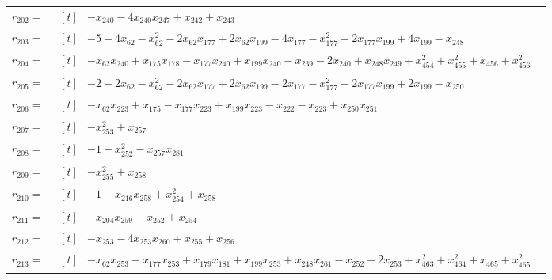 \begin{longtable}{@{}r p{0.92\linewidth}@{}}
$r_{202}=$ & $\begin{aligned}[t]&-x_{240}-4x_{240}x_{247}+x_{242}+x_{243}\end{aligned}$ \\[2pt]
$r_{203}=$ & $\begin{aligned}[t]&-5-4x_{62}-x_{62}^{2}-2x_{62}x_{177}+2x_{62}x_{199}-4x_{177}-x_{177}^{2}+2x_{177}x_{199}+4x_{199}-x_{248}\end{aligned}$ \\[2pt]
$r_{204}=$ & $\begin{aligned}[t]&-x_{62}x_{240}+x_{175}x_{178}-x_{177}x_{240}+x_{199}x_{240}-x_{239}-2x_{240}+x_{248}x_{249}+x_{454}^{2}+x_{455}^{2}+x_{456}+x_{456}^{2}\end{aligned}$ \\[2pt]
$r_{205}=$ & $\begin{aligned}[t]&-2-2x_{62}-x_{62}^{2}-2x_{62}x_{177}+2x_{62}x_{199}-2x_{177}-x_{177}^{2}+2x_{177}x_{199}+2x_{199}-x_{250}\end{aligned}$ \\[2pt]
$r_{206}=$ & $\begin{aligned}[t]&-x_{62}x_{223}+x_{175}-x_{177}x_{223}+x_{199}x_{223}-x_{222}-x_{223}+x_{250}x_{251}\end{aligned}$ \\[2pt]
$r_{207}=$ & $\begin{aligned}[t]&-x_{253}^{2}+x_{257}\end{aligned}$ \\[2pt]
$r_{208}=$ & $\begin{aligned}[t]&-1+x_{252}^{2}-x_{257}x_{281}\end{aligned}$ \\[2pt]
$r_{209}=$ & $\begin{aligned}[t]&-x_{255}^{2}+x_{258}\end{aligned}$ \\[2pt]
$r_{210}=$ & $\begin{aligned}[t]&-1-x_{216}x_{258}+x_{254}^{2}+x_{258}\end{aligned}$ \\[2pt]
$r_{211}=$ & $\begin{aligned}[t]&-x_{204}x_{259}-x_{252}+x_{254}\end{aligned}$ \\[2pt]
$r_{212}=$ & $\begin{aligned}[t]&-x_{253}-4x_{253}x_{260}+x_{255}+x_{256}\end{aligned}$ \\[2pt]
$r_{213}=$ & $\begin{aligned}[t]&-x_{62}x_{253}-x_{177}x_{253}+x_{179}x_{181}+x_{199}x_{253}+x_{248}x_{261}-x_{252}-2x_{253}+x_{463}^{2}+x_{464}^{2}+x_{465}+x_{465}^{2}\end{aligned}$ \\[2pt]

\end{longtable}
